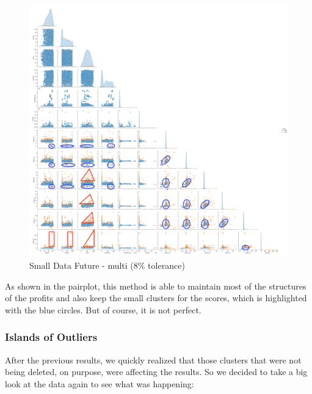 \documentclass[11pt,english,a4paper,hidelinks]{book}
\begin{document}
\begin{figure}[H]
    \centering
    \includegraphics[width=1\textwidth]{images/code/outliers/Small Data future - Multi.png}
    \caption{Small Data Future - \acrshort{multi} (8\% tolerance)}
    \label{fig:small_data_future_multi}
\end{figure}

\noindent As shown in the \acrshort{pairplot}, this method is able to maintain most of the structures of the profits and also keep the small clusters for the scores, which is highlighted with the blue circles. But of course, it is not perfect. 


\subsubsection{Islands of Outliers}

\noindent After the previous results, we quickly realized that those clusters that were not being deleted, on purpose, were affecting the results. So we decided to take a big look at the data again to see what was happening:
\end{document}
